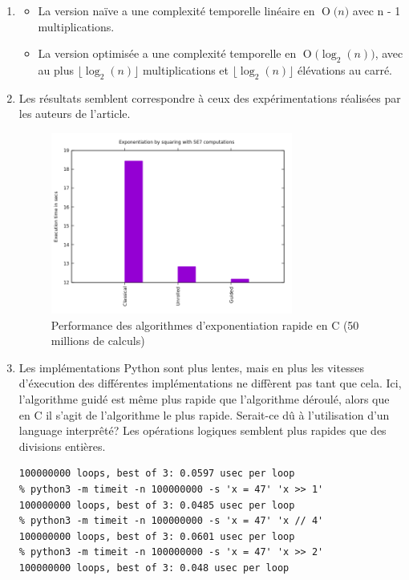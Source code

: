 \documentclass[paper=a4, fontsize=11pt]{scrartcl}
\numberwithin{equation}{section}		%
\numberwithin{figure}{section}			%
\numberwithin{table}{section}				%
\newcommand{\BigO}[1]{\ensuremath{\operatorname{O}\bigl(#1\bigr)}}
\begin{document}
\begin{enumerate}
	\item{
\begin{itemize}
    \item La version naïve a une complexité temporelle linéaire en \BigO{n} avec n - 1 multiplications.
    \item
 La version optimisée a une complexité temporelle en \BigO{\log _2 \left( n \right )}, avec
    au plus $\lfloor \log _2 \left( n \right ) \rfloor$ multiplications et $\lfloor \log _2 \left( n \right ) \rfloor$ élévations au carré.
\end{itemize}}

\clearpage

	\item Les résultats semblent correspondre à ceux des expérimentations réalisées par les auteurs de l'article.

\begin{figure}[h]
  \caption{Performance des algorithmes d'exponentiation rapide en C (50 millions de calculs)}
\centering\includegraphics[width=0.75\textwidth]{expsqu50m_c.png}
\end{figure}

    \item Les implémentations Python sont plus lentes, mais en plus les vitesses d'éxecution des
 différentes implémentations ne diffèrent pas tant que cela. Ici, l'algorithme guidé est même plus
rapide que l'algorithme déroulé, alors que en C il s'agit de l'algorithme le plus rapide.
Serait-ce dû à l'utilisation d'un language interprêté? Les opérations logiques semblent plus rapides
que des divisions entières.

\lstset{language=bash}          
\begin{lstlisting}[frame=single]
% python3 -m timeit -n 100000000 -s 'x = 47' 'x // 2'
100000000 loops, best of 3: 0.0597 usec per loop
% python3 -m timeit -n 100000000 -s 'x = 47' 'x >> 1'
100000000 loops, best of 3: 0.0485 usec per loop
% python3 -m timeit -n 100000000 -s 'x = 47' 'x // 4' 
100000000 loops, best of 3: 0.0601 usec per loop
% python3 -m timeit -n 100000000 -s 'x = 47' 'x >> 2'
100000000 loops, best of 3: 0.048 usec per loop
\end{lstlisting}


\end{enumerate}
\end{document}
